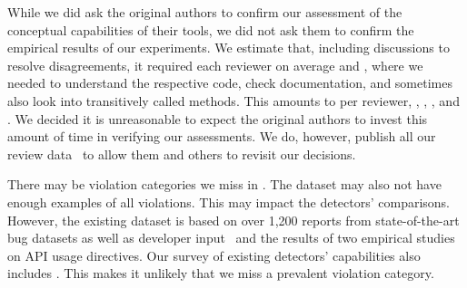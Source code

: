 %
While we did ask the original authors to confirm our assessment of the conceptual capabilities of their tools, we did not ask them to confirm the empirical results of our experiments.
We estimate that, including discussions to resolve disagreements, it required each reviewer on average  and , where we needed to understand the respective code, check documentation, and sometimes also look into transitively called methods.
This amounts to  per reviewer, , , , and .
We decided it is unreasonable to expect the original authors to invest this amount of time in verifying our assessments.
We do, however, publish all our review data~\cite{artifact-page} to allow them and others to revisit our decisions.


There may be violation categories we miss in \MUC.
The \MUBench dataset may also not have enough examples of all violations.
This may impact the detectors' comparisons.
However, the existing \MUBench dataset is based on over 1,200 reports from state-of-the-art bug datasets as well as developer input~\cite{ANNN+16} and the results of two empirical studies on API usage directives.
Our survey of existing detectors' capabilities also includes .
This makes it unlikely that we miss a prevalent violation category.


